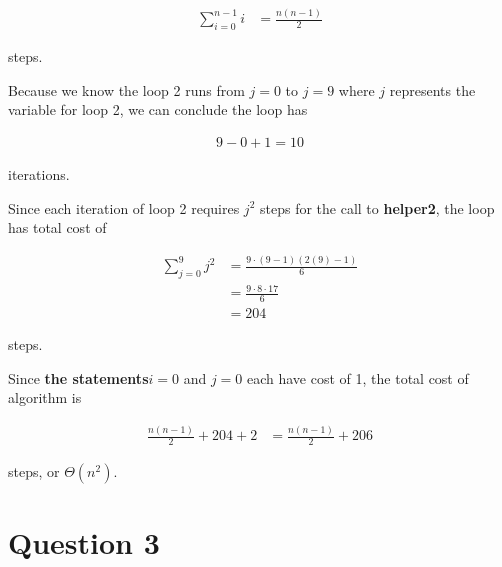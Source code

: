 \documentclass[12pt]{article}
\begin{document}
\begin{enumerate}[a.]
\begin{mdframed}
        \color{red}
        \begin{align}
            \sum\limits_{i=0}^{n-1} i &= \frac{n(n-1)}{2}
        \end{align}
        \color{black}

        steps.

        \bigskip

        Because we know the loop 2 runs from $j = 0$ to $j = 9$ \color{red}where $j$
        represents the variable for loop 2\color{black}, we can conclude
        the loop has

        \begin{align}
            9 - 0 + 1 = 10
        \end{align}

        iterations.

        \bigskip

        Since each iteration of loop 2 requires \color{red}\textbf{$j^2$}\color{black}
        \:steps for the call to \textbf{helper2}, the loop has total cost of

        \color{red}
        \begin{align}
            \sum\limits_{j=0}^{9} j^2 &= \frac{9 \cdot (9 - 1)(2(9) - 1)}{6}\\
            &= \frac{9 \cdot 8 \cdot 17}{6}\\
            &= 204
        \end{align}
        \color{black}

        steps.

        \bigskip

        Since \color{red}\textbf{the statements}\color{black}\:$i = 0$ and $j = 0$
        each have cost of 1, the total cost of algorithm is

        \color{red}
        \begin{align}
            \frac{n(n-1)}{2} + 204 + 2 &= \frac{n(n-1)}{2} + 206
        \end{align}
        \color{black}

        steps, or $\Theta(n^2)$.

    \end{mdframed}

\end{enumerate}

\section*{Question 3}
\end{document}
